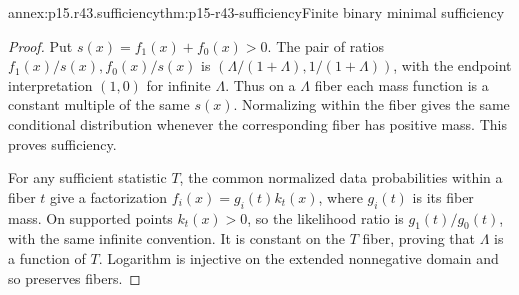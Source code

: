 \begin{annexitem}{annex:p15.r43.sufficiency}{thm:p15-r43-sufficiency}{Finite binary minimal sufficiency}
\begin{proof}
Put \(s(x)=f_1(x)+f_0(x)>0\). The pair of ratios
\(f_1(x)/s(x),f_0(x)/s(x)\) is
\((\Lambda/(1+\Lambda),1/(1+\Lambda))\), with the endpoint
interpretation \((1,0)\) for infinite \(\Lambda\). Thus on a \(\Lambda\) fiber each
mass function is a constant multiple of the same \(s(x)\). Normalizing
within the fiber gives the same conditional distribution whenever the
corresponding fiber has positive mass. This proves sufficiency.

For any sufficient statistic \(T\), the common normalized data probabilities
within a fiber \(t\) give a factorization
\(f_i(x)=g_i(t)k_t(x)\), where \(g_i(t)\) is its fiber mass.
On supported points \(k_t(x)>0\), so the likelihood ratio is
\(g_1(t)/g_0(t)\), with the same infinite convention. It is constant
on the \(T\) fiber, proving that \(\Lambda\) is a function of \(T\). Logarithm is
injective on the extended nonnegative domain and so preserves fibers.
\end{proof}
\end{annexitem}

